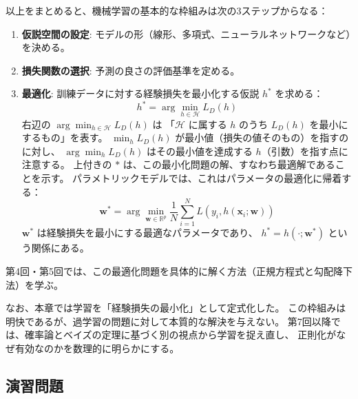 以上をまとめると、機械学習の基本的な枠組みは次の3ステップからなる：

\begin{enumerate}
  \item \textbf{仮説空間の設定}: モデルの形（線形、多項式、ニューラルネットワークなど）を決める。
  \item \textbf{損失関数の選択}: 予測の良さの評価基準を定める。
  \item \textbf{最適化}: 訓練データに対する経験損失を最小化する仮説 $h^*$ を求める：
    \begin{equation}
      h^* = \arg\min_{h \in \mathcal{H}} L_D(h)
    \end{equation}
    右辺の $\arg\min_{h \in \mathcal{H}} L_D(h)$ は
    「$\mathcal{H}$ に属する $h$ のうち $L_D(h)$ を最小にするもの」を表す。
    $\min_{h} L_D(h)$ が最小値（損失の値そのもの）を指すのに対し、
    $\arg\min_{h} L_D(h)$ はその最小値を達成する $h$（引数）を指す点に注意する。
    上付きの $*$ は、この最小化問題の解、すなわち最適解であることを示す。
    パラメトリックモデルでは、これはパラメータの最適化に帰着する：
    \begin{equation}
      \bm{w}^* = \arg\min_{\bm{w} \in \mathbb{R}^p}
      \frac{1}{N} \sum_{i=1}^{N} L(y_i, h(\bm{x}_i; \bm{w}))
    \end{equation}
    $\bm{w}^*$ は経験損失を最小にする最適なパラメータであり、
    $h^* = h(\cdot; \bm{w}^*)$ という関係にある。
\end{enumerate}

第4回・第5回では、この最適化問題を具体的に解く方法（正規方程式と勾配降下法）を学ぶ。

なお、本章では学習を「経験損失の最小化」として定式化した。
この枠組みは明快であるが、過学習の問題に対して本質的な解決を与えない。
第7回以降では、確率論とベイズの定理に基づく別の視点から学習を捉え直し、
正則化がなぜ有効なのかを数理的に明らかにする。


\subsection{演習問題}

